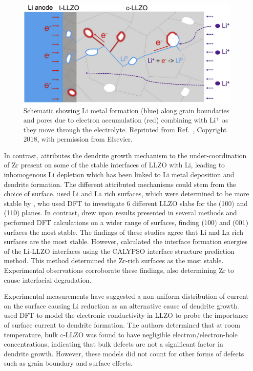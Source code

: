 \documentclass[../main.tex]{subfiles}
\begin{document}
\begin{figure}[H]
    \centering
    \includegraphics{figures/tian_grain_growth.png}
    \caption{Schematic showing Li metal formation (blue) along grain boundaries and pores due to electron accumulation (red) combining with Li$^+$ as they move through the electrolyte. Reprinted from Ref.~, Copyright 2018, with permission from Elsevier.}
    \label{fig:tian2020}
\end{figure}

In contrast, \citeauthor{Gao2020} attributes the dendrite growth mechanism to the under-coordination of Zr present on some of the stable interfaces of LLZO with Li,\cite{Gao2020} leading to inhomogenous Li depletion which has been linked to Li metal deposition and dendrite formation.\cite{Tsai2016} The different attributed mechanisms could stem from the choice of surface. \citeauthor{Tian2018} used Li and La rich surfaces, which were determined to be more stable by \citeauthor{Thompson2017}, who used DFT to investigate 6 different LLZO slabs for the (100) and (110) planes.\cite{Thompson2017} In contrast, \citeauthor{Gao2020} drew upon results presented in several methods\cite{Thompson2017, Canepa2018, Yu2016a} and performed DFT calculations on a wider range of surfaces, finding (100) and (001) surfaces the most stable. The findings of these studies agree that Li and La rich surfaces are the most stable. However, \citeauthor{Gao2020} calculated the interface formation energies of the Li-LLZO interfaces using the CALYPSO interface structure prediction method\cite{Wang2012, Gao2019}. This method determined the Zr-rich surfaces as the most stable. Experimental observations corroborate these findings, also determining Zr to cause interfacial degradation\cite{Zhu2019}.

Experimental measurements have suggested a non-uniform distribution of current on the surface causing Li reduction as an alternative cause of dendrite growth.\cite{Han2019_dendrite, Aguesse2017} \citeauthor{squires_2020} used DFT to model the electronic conductivity in LLZO to probe the importance of surface current to dendrite formation.\cite{squires_2020} The authors determined that at room temperature, bulk c-LLZO was found to have negligible electron/electron-hole concentrations, indicating that bulk defects are not a significant factor in dendrite growth. However, these models did not count for other forms of defects such as grain boundary and surface effects. 
\end{document}

